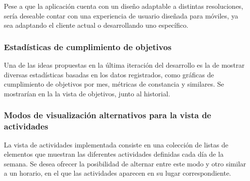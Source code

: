 \documentclass[10pt, a4paper]{aqademic}
\begin{document}
Pese a que la aplicación cuenta con un diseño adaptable a distintas resoluciones, sería deseable contar con una experiencia de usuario diseñada para móviles, ya sea adaptando el cliente actual o desarrollando uno específico.


\subsubsection*{Estadísticas de cumplimiento de objetivos}

Una de las ideas propuestas en la última iteración del desarrollo es la de mostrar diversas estadísticas basadas en los datos registrados, como gráficas de cumplimiento de objetivos por mes, métricas de constancia y similares. Se mostrarían en la la vista de objetivos, junto al historial.


\subsubsection*{Modos de visualización alternativos para la vista de actividades}

La vista de actividades implementada consiste en una colección de listas de elementos que muestran las diferentes actividades definidas cada día de la semana. Se desea ofrecer la posibilidad de alternar entre este modo y otro similar a un horario, en el que las actividades aparecen en su lugar correspondiente.


\newpage

\renewcommand{\bibpreamble}{Todas las referencias web aquí listadas fueron revisadas el día 5 de septiembre de 2021.\\}



\end{document}
